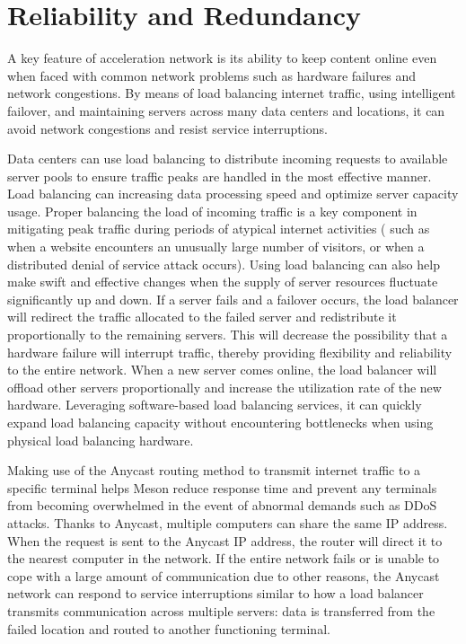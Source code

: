 \documentclass[12pt, a4paper, unicode]{report}
\begin{document}
    \section{Reliability and Redundancy}
        A key feature of acceleration network is its ability to keep content online even when faced with common network problems such as hardware failures and network congestions. By means of load balancing internet traffic, using intelligent failover, and maintaining servers across many data centers and locations, it can avoid network congestions and resist service interruptions.
    
        Data centers can use load balancing to distribute incoming requests to available server pools to ensure traffic peaks are handled in the most effective manner. Load balancing can increasing data processing speed and optimize server capacity usage. Proper balancing the load of incoming traffic is a key component in mitigating peak traffic during periods of atypical internet activities ( such as when a website encounters an unusually large number of visitors, or when a distributed denial of service attack occurs). Using load balancing can also help make swift and effective changes when the supply of server resources fluctuate significantly up and down. If a server fails and a failover occurs, the load balancer will redirect the traffic allocated to the failed server and redistribute it proportionally to the remaining servers. This will decrease the possibility that a hardware failure will interrupt traffic, thereby providing flexibility and reliability to the entire network. When a new server comes online, the load balancer will offload other servers proportionally and increase the utilization rate of the new hardware. Leveraging software-based load balancing services, it can quickly expand load balancing capacity without encountering bottlenecks when using physical load balancing hardware.

        Making use of the Anycast routing method to transmit internet traffic to a specific terminal helps Meson reduce response time and prevent any terminals from becoming overwhelmed in the event of abnormal demands such as DDoS attacks. Thanks to Anycast, multiple computers can share the same IP address. When the request is sent to the Anycast IP address, the router will direct it to the nearest computer in the network. If the entire network fails or is unable to cope with a large amount of communication due to other reasons, the Anycast network can respond to service interruptions similar to how a load balancer transmits communication across multiple servers: data is transferred from the failed location and routed to another functioning terminal.
\end{document}
